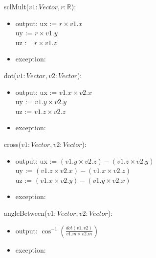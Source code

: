 \documentclass[12pt, titlepage]{article}
\begin{document}
\noindent sclMult($v1:Vector, r:\mathbb{R}$):
\begin{itemize}
	\item output: 
	ux := $r \times v1.x$ \\
	uy := $r \times v1.y$ \\
	uz := $r \times v1.z$ \\	
	\item exception: \\
\end{itemize} 


\noindent dot($v1:Vector, v2:Vector$):
\begin{itemize}
	\item output: 
	ux := $v1.x \times v2.x$ \\
	uy := $v1.y \times v2.y$ \\
	uz := $v1.z \times v2.z$ \\
	\item exception: \\
\end{itemize} 

\noindent cross($v1:Vector, v2:Vector$):
\begin{itemize}
	\item output: 
	ux := $(v1.y \times v2.z) - (v1.z \times v2.y)$  \\
	uy := $(v1.z \times v2.x) - (v1.x \times v2.z)$  \\
	uz := $(v1.x \times v2.y) - (v1.y \times v2.x)$  \\
	\item exception: \\
\end{itemize} 

\noindent angleBetween($v1:Vector, v2:Vector$):
\begin{itemize}
	\item output: $\cos^{-1}(\frac{dot(v1, v2)}{v1.m \times v2.m})$
	\item exception: \\
\end{itemize}
\end{document}
